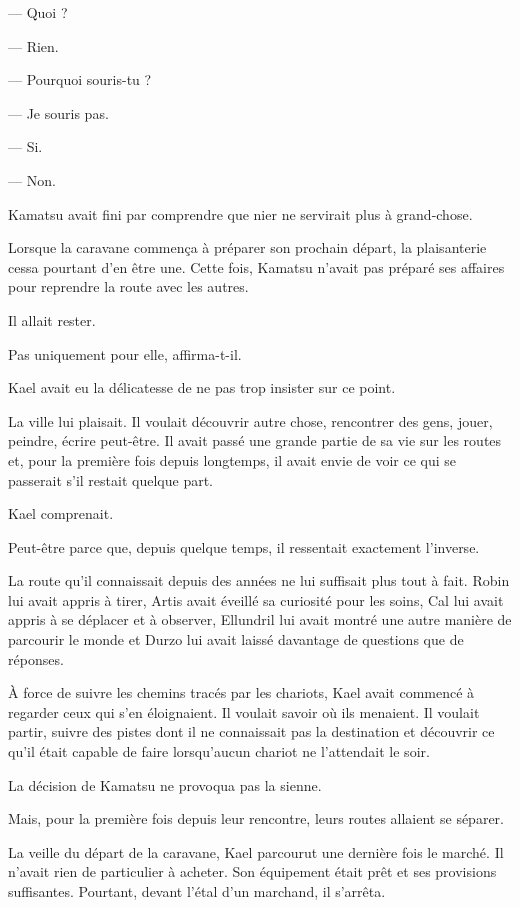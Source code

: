 — Quoi ?

— Rien.

— Pourquoi souris-tu ?

— Je souris pas.

— Si.

— Non.

Kamatsu avait fini par comprendre que nier ne servirait plus à grand-chose.

Lorsque la caravane commença à préparer son prochain départ, la plaisanterie
cessa pourtant d'en être une. Cette fois, Kamatsu n'avait pas préparé ses
affaires pour reprendre la route avec les autres.

Il allait rester.

Pas uniquement pour elle, affirma-t-il.

Kael avait eu la délicatesse de ne pas trop insister sur ce point.

La ville lui plaisait. Il voulait découvrir autre chose, rencontrer des gens,
jouer, peindre, écrire peut-être. Il avait passé une grande partie de sa vie
sur les routes et, pour la première fois depuis longtemps, il avait envie de
voir ce qui se passerait s'il restait quelque part.

Kael comprenait.

Peut-être parce que, depuis quelque temps, il ressentait exactement l'inverse.

La route qu'il connaissait depuis des années ne lui suffisait plus tout à fait.
Robin lui avait appris à tirer, Artis avait éveillé sa curiosité pour les
soins, Cal lui avait appris à se déplacer et à observer, Ellundril lui avait
montré une autre manière de parcourir le monde et Durzo lui avait laissé
davantage de questions que de réponses.

À force de suivre les chemins tracés par les chariots, Kael avait commencé à
regarder ceux qui s'en éloignaient. Il voulait savoir où ils menaient. Il
voulait partir, suivre des pistes dont il ne connaissait pas la
destination et découvrir ce qu'il était capable de faire lorsqu'aucun chariot
ne l'attendait le soir.

La décision de Kamatsu ne provoqua pas la sienne.

Mais, pour la première fois depuis leur rencontre, leurs routes allaient se
séparer.

\scenebreak

La veille du départ de la caravane, Kael parcourut une dernière fois le marché.
Il n'avait rien de particulier à acheter. Son équipement était prêt et ses
provisions suffisantes. Pourtant, devant l'étal d'un marchand, il s'arrêta.

